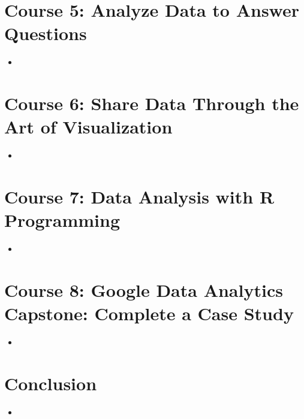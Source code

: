 \documentclass[]{article}
\begin{document}
\section{Course 5: Analyze Data to Answer Questions}
\begin{itemize}
  \item
\end{itemize}
\section{Course 6: Share Data Through the Art of Visualization}
\begin{itemize}
  \item
\end{itemize}
\section{Course 7: Data Analysis with R Programming}
\begin{itemize}
  \item
\end{itemize}
\section{Course 8: Google Data Analytics Capstone: Complete a Case Study}
\begin{itemize}
  \item
\end{itemize}
\section{Conclusion}
\begin{itemize}
  \item
\end{itemize}
\end{document}
